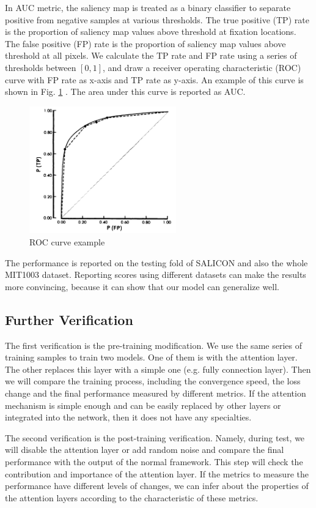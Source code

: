 \documentclass[12pt]{article}
\begin{document}
In AUC metric,
the saliency map is treated as a binary classifier to separate positive from negative samples at various thresholds. 
The true positive (TP) rate is the proportion of saliency map values above threshold at fixation locations. 
The false positive (FP) rate is the proportion of saliency map values above threshold at all pixels. 
We calculate the TP rate and FP rate using a series of thresholds between $[0, 1]$, and draw a
receiver operating characteristic (ROC) curve with FP rate as x-axis and TP rate as y-axis.
An example of this curve is shown in Fig. \ref{img:AUC} \cite{hanleyMeaningUseArea1982}.
The area under this curve is reported as AUC.
\begin{figure}[!h]
    \centering
    \includegraphics[width=2.5in]{imgs/AUC.png}
    \caption{ROC curve example}
    \label{img:AUC}
\end{figure}


The performance is reported on the testing fold of SALICON and also the whole MIT1003 dataset.
Reporting scores using different datasets can make the results more convincing,
because it can show that our model can generalize well.
\subsection{Further Verification}

The first verification is the pre-training modification. We use the same series of training samples to train two models. One of them is with the attention layer. The other replaces this layer with a simple one (e.g. fully connection layer). Then we will compare the training process, including the convergence speed, the loss change and the final performance measured by different metrics. If the attention mechanism is simple enough and can be easily replaced by other layers or integrated into the network, then it does not have any specialties.

The second verification is the post-training verification. Namely, during test, we will disable the attention layer or add random noise and compare the final performance with the output of the normal framework. This step will check the contribution and importance of the attention layer. If the metrics to measure the performance have different levels of changes, we can infer about the properties of the attention layers according to the characteristic of these metrics.
\end{document}
